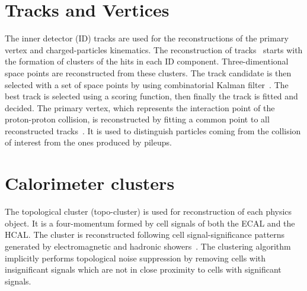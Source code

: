 \section{Tracks and Vertices}
The inner detector (ID) tracks are used for the reconstructions of the primary vertex and charged-particles kinematics.
The reconstruction of tracks~\cite{PERF-2015-08} starts with the formation of clusters of the hits in each ID component.
Three-dimentional space points are reconstructed from these clusters.
The track candidate is then selected with a set of space points by using combinatorial Kalman filter~\cite{FRUHWIRTH1987444}. 
The best track is selected using a scoring function, then finally the track is fitted and decided. 
The primary vertex, which represents the interaction point of the proton-proton collision, is reconstructed by fitting a common point to all reconstructed tracks~\cite{PERF-2015-01}. It is used to distinguish particles coming from the collision of interest from the ones produced by pileups.
\section{Calorimeter clusters} 
The topological cluster (topo-cluster) is used for reconstruction of each physics object. It is a four-momentum formed by cell signals of both the ECAL and the HCAL.
The cluster is reconstructed following cell signal-significance patterns generated by electromagnetic and hadronic showers~\cite{PERF-2014-07}.
The clustering algorithm implicitly performs topological noise suppression by removing cells with insignificant signals which are not in close proximity to cells with significant signals. 
